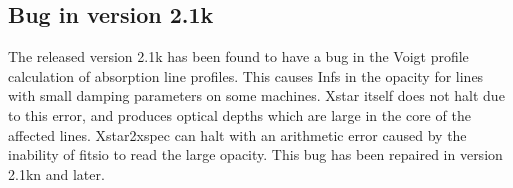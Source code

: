 \subsection{Bug in version 2.1k}

The released version 2.1k has been found to have a bug in the Voigt profile calculation
of absorption line profiles.  This causes Infs in the opacity for lines with small 
damping parameters on some machines.  Xstar itself does not halt due to this error, 
and produces optical depths which are large in the core of the affected lines.
Xstar2xspec can halt with an arithmetic error caused by the inability of fitsio to 
read the large opacity.  This bug has been repaired in version 2.1kn and later.


